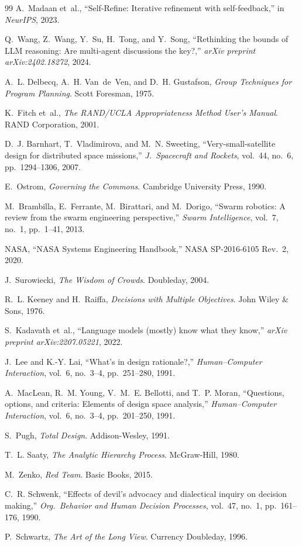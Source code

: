 \documentclass[11pt,a4paper]{article}
\begin{document}
\begin{thebibliography}{99}
A.~Madaan et~al., ``Self-Refine: Iterative refinement with self-feedback,'' in \emph{NeurIPS}, 2023.

Q.~Wang, Z.~Wang, Y.~Su, H.~Tong, and Y.~Song, ``Rethinking the bounds of LLM reasoning: Are multi-agent discussions the key?,'' \emph{arXiv preprint arXiv:2402.18272}, 2024.

A.~L. Delbecq, A.~H. Van~de~Ven, and D.~H. Gustafson, \emph{Group Techniques for Program Planning}. Scott Foresman, 1975.

K.~Fitch et~al., \emph{The RAND/UCLA Appropriateness Method User's Manual}. RAND Corporation, 2001.

D.~J. Barnhart, T.~Vladimirova, and M.~N. Sweeting, ``Very-small-satellite design for distributed space missions,'' \emph{J.\ Spacecraft and Rockets}, vol.~44, no.~6, pp.~1294--1306, 2007.

E.~Ostrom, \emph{Governing the Commons}. Cambridge University Press, 1990.

M.~Brambilla, E.~Ferrante, M.~Birattari, and M.~Dorigo, ``Swarm robotics: A review from the swarm engineering perspective,'' \emph{Swarm Intelligence}, vol.~7, no.~1, pp.~1--41, 2013.

NASA, ``NASA Systems Engineering Handbook,'' NASA SP-2016-6105 Rev.~2, 2020.

J.~Surowiecki, \emph{The Wisdom of Crowds}. Doubleday, 2004.

R.~L. Keeney and H.~Raiffa, \emph{Decisions with Multiple Objectives}. John Wiley \& Sons, 1976.

S.~Kadavath et~al., ``Language models (mostly) know what they know,'' \emph{arXiv preprint arXiv:2207.05221}, 2022.

J.~Lee and K.-Y. Lai, ``What's in design rationale?,'' \emph{Human--Computer Interaction}, vol.~6, no.~3--4, pp.~251--280, 1991.

A.~MacLean, R.~M. Young, V.~M.~E. Bellotti, and T.~P. Moran, ``Questions, options, and criteria: Elements of design space analysis,'' \emph{Human--Computer Interaction}, vol.~6, no.~3--4, pp.~201--250, 1991.

S.~Pugh, \emph{Total Design}. Addison-Wesley, 1991.

T.~L. Saaty, \emph{The Analytic Hierarchy Process}. McGraw-Hill, 1980.

M.~Zenko, \emph{Red Team}. Basic Books, 2015.

C.~R. Schwenk, ``Effects of devil's advocacy and dialectical inquiry on decision making,'' \emph{Org.\ Behavior and Human Decision Processes}, vol.~47, no.~1, pp.~161--176, 1990.

P.~Schwartz, \emph{The Art of the Long View}. Currency Doubleday, 1996.

\end{thebibliography}
\end{document}

